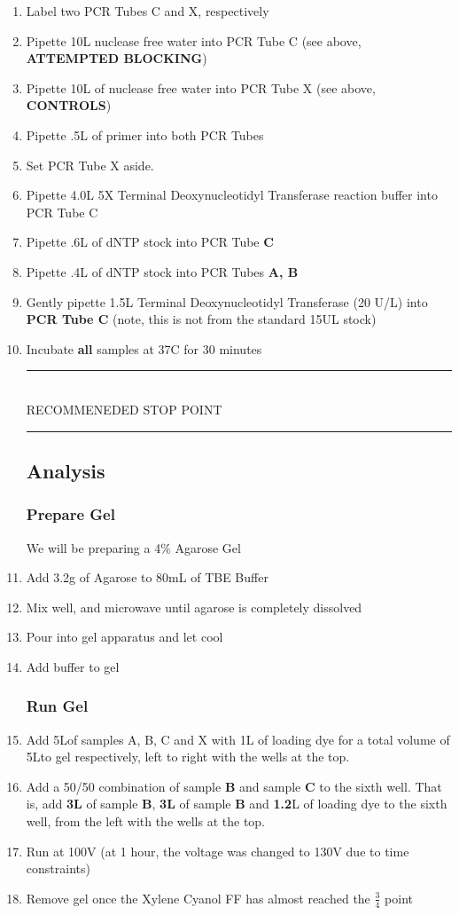 \documentclass[letterpaper]{article}
\newcommand{\tdt}{Terminal Deoxynucleotidyl Transferase}
\newcommand{\C}{\degree{}C}
\newcommand{\uL}{\micro{}L}
\newcommand{\RstopPoint}{\begin{center}
\rule{0.5\textwidth}{.4pt}\\
\vspace{1mm} 
RECOMMENEDED STOP POINT\\
\rule{0.5\textwidth}{.4pt}
\end{center}}
\begin{document}
\begin{enumerate}
\subsection{Extending}
Based off of our standard \tdt{} extending procedure \cite{genTdT}.
\item{Label two PCR Tubes C and X, respectively}
\item{Pipette 10\uL{} nuclease free water into PCR Tube C (see above, \textbf{ATTEMPTED BLOCKING})}
\item{Pipette 10\uL{} of nuclease free water into PCR Tube X (see above, \textbf{CONTROLS})}
\item{Pipette .5\uL{} of primer into both PCR Tubes}
\item{Set PCR Tube X aside.}
\item{Pipette 4.0\uL{} 5X \tdt{} reaction buffer into PCR Tube C}
\item{Pipette .6\uL{} of dNTP stock into PCR Tube \textbf{C}}
\item{Pipette .4\uL{} of dNTP stock into PCR Tubes \textbf{A, B}}
\item{Gently pipette 1.5\uL{} \tdt{} (20 U/\uL{}) into \textbf{PCR Tube C} (note, this is not from the standard 15U\uL{} stock)}
\item{Incubate \textbf{all} samples at 37\C{} for 30 minutes}\\
\RstopPoint{} 
\subsection{Analysis}
\subsubsection{Prepare Gel}
We will be preparing a 4\% Agarose Gel \cite{dnaAgarose}
\item{Add 3.2g of Agarose to 80mL of TBE Buffer}
\item{Mix well, and microwave until agarose is completely dissolved}
\item{Pour into gel apparatus and let cool}
\item{Add buffer to gel}
\subsubsection{Run Gel}
\item{Add 5\uL of samples A, B, C and X with 1\uL{} of loading dye for a total volume of 5\uL to gel respectively, left to right with the wells at the top.}
\item{Add a 50/50 combination of sample \textbf{B} and sample \textbf{C} to the sixth well. That is, add \textbf{3\uL{}} of sample \textbf{B}, \textbf{3\uL{}} of sample \textbf{B} and \textbf{1.2}\uL{} of loading dye to the sixth well, from the left with the wells at the top.}
\item{Run at 100V (at 1 hour, the voltage was changed to 130V due to time constraints)}
\item{Remove gel once the Xylene Cyanol FF has almost reached the $\frac{3}{4}$ point \cite{dnaAgarose}}


\end{enumerate}
\end{document}
